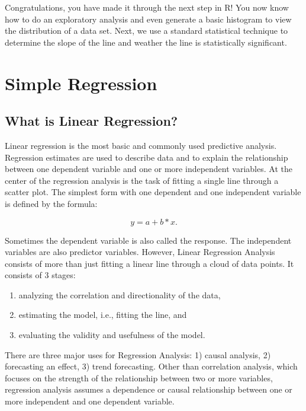 \documentclass{article}\usepackage[]{graphicx}\usepackage[]{color}
\begin{document}
Congratulations, you have made it through the next step in R!  You now know how to do an exploratory analysis and even generate a basic histogram to view the distribution of a data set. Next, we use a standard statistical technique to determine the slope of the line and weather the line is statistically significant.


\section{Simple Regression}

\subsection{What is Linear Regression?}

Linear regression is the most basic and commonly used predictive analysis.  Regression estimates are used to describe data and to explain the relationship between one dependent variable and one or more independent variables.  At the center of the regression analysis is the task of fitting a single line through a scatter plot.  The simplest form with one dependent and one independent variable is defined by the formula:

\begin{equation}
y = a + b*x.
\end{equation}

Sometimes the dependent variable is also called the response.  The independent variables are also predictor variables.  However, Linear Regression Analysis consists of more than just fitting a linear line through a cloud of data points.  It consists of 3 stages:

\begin{enumerate}
  \item analyzing the correlation and directionality of the data, 
  \item estimating the model, i.e., fitting the line, and 
  \item evaluating the validity and usefulness of the model.
\end{enumerate}

There are three major uses for Regression Analysis: 1) causal analysis, 2) forecasting an effect, 3) trend forecasting.  Other than correlation analysis, which focuses on the strength of the relationship between two or more variables, regression analysis assumes a dependence or causal relationship between one or more independent and one dependent variable.
\end{document}
